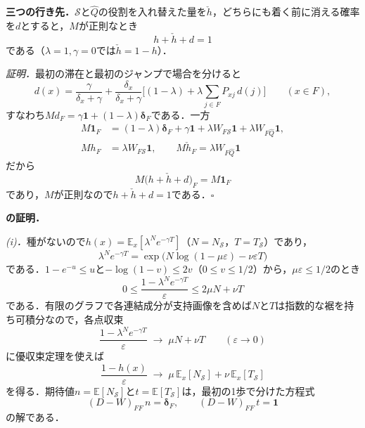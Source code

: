 \appblock
\textbf{三つの行き先．}$\mathcal{S}$と$\hat{Q}$の役割を入れ替えた量を$\check h$，どちらにも着く前に消える確率を$d$とすると，$M$が正則なとき
\begin{equation*}
h+\check h+d=1
\end{equation*}
である（$\lambda{=}1,\gamma{=}0$では$\check h=1-h$）．

\textit{証明．}最初の滞在と最初のジャンプで場合を分けると
\begin{equation*}
d(x)=\frac{\gamma}{\delta_x+\gamma}+\frac{\delta_x}{\delta_x+\gamma}\Big[(1-\lambda)+\lambda\sum_{j\in F}P_{xj}\,d(j)\Big]\qquad(x\in F),
\end{equation*}
すなわち$Md_F=\gamma\mathbf{1}+(1-\lambda)\boldsymbol{\delta}_F$である．一方
\begin{align*}
M\mathbf{1}_F&=(1-\lambda)\boldsymbol{\delta}_F+\gamma\mathbf{1}+\lambda W_{F\mathcal{S}}\mathbf{1}+\lambda W_{F\hat{Q}}\mathbf{1},\\
Mh_F&=\lambda W_{F\mathcal{S}}\mathbf{1},\qquad M\check h_F=\lambda W_{F\hat{Q}}\mathbf{1}
\end{align*}
だから
\begin{equation*}
M\big(h+\check h+d\big)_F=M\mathbf{1}_F
\end{equation*}
であり，$M$が正則なので$h+\check h+d=1$である．$\square$

\appblock
\textbf{\TLimits{}の証明．}

\textit{(i)．}種がないので$h(x)=\mathbb{E}_x[\lambda^{N}e^{-\gamma T}]$（$N=N_{\mathcal{S}}$，$T=T_{\mathcal{S}}$）であり，
\begin{equation*}
\lambda^{N}e^{-\gamma T}=\exp\big(N\log(1-\mu\varepsilon)-\nu\varepsilon T\big)
\end{equation*}
である．$1-e^{-u}\le u$と$-\log(1-v)\le2v$（$0\le v\le1/2$）から，$\mu\varepsilon\le1/2$のとき
\begin{equation*}
0\le\frac{1-\lambda^{N}e^{-\gamma T}}{\varepsilon}\le2\mu N+\nu T
\end{equation*}
である．有限のグラフで各連結成分が支持画像を含めば$N$と$T$は指数的な裾を持ち可積分なので，各点収束
\begin{equation*}
\frac{1-\lambda^{N}e^{-\gamma T}}{\varepsilon}\;\longrightarrow\;\mu N+\nu T\qquad(\varepsilon\to0)
\end{equation*}
に優収束定理を使えば
\begin{equation*}
\frac{1-h(x)}{\varepsilon}\;\longrightarrow\;\mu\,\mathbb{E}_x[N_{\mathcal{S}}]+\nu\,\mathbb{E}_x[T_{\mathcal{S}}]
\end{equation*}
を得る．期待値$n=\mathbb{E}[N_{\mathcal{S}}]$と$t=\mathbb{E}[T_{\mathcal{S}}]$は，最初の1歩で分けた方程式
\begin{equation*}
(D-W)_{FF}\,n=\boldsymbol{\delta}_F,\qquad(D-W)_{FF}\,t=\mathbf{1}
\end{equation*}
の解である．

